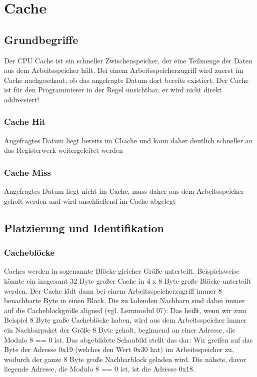 \section{Cache}
	\subsection{Grundbegriffe}
		Der CPU Cache ist ein schneller Zwischenspeicher, der eine Teilmenge der Daten aus dem Arbeitsspeicher hält. Bei einem Arbeitsspeicherzugriff wird zuerst im Cache nachgeschaut, ob das angefragte Datum dort bereits existiert. Der Cache ist für den Programmierer in der Regel unsichtbar, er wird nicht direkt addressiert!
		\subsubsection{Cache Hit}
			Angefragtes Datum liegt bereits im Chache und kann daher deutlich schneller an das Registerwerk weitergeleitet werden
		\subsubsection{Cache Miss}
			Angefragtes Datum liegt nicht im Cache, muss daher aus dem Arbeitsspeicher geholt werden und wird anschließend im Cache abgelegt
	\subsection{Platzierung und Identifikation}
		\subsubsection{Cacheblöcke}
			Caches werden in sogenannte Blöcke gleicher Größe unterteilt. Beispielsweise könnte ein insgesamt 32 Byte großer Cache in 4 x 8 Byte große Blöcke unterteilt werden. Der Cache lädt dann bei einem Arbeitsspeicherzugriff immer 8 benachbarte Byte in einen Block.
			\newline \newline
			Die zu ladenden Nachbarn sind dabei immer auf die Cacheblockgröße \glqq aligned \grqq (vgl. Lernmodul 07): Das heißt, wenn wir zum Beispiel 8 Byte große Cacheblöcke haben, wird aus dem Arbeitsspeicher immer ein Nachbarpaket der Größe 8 Byte geholt, beginnend an einer Adresse, die Modulo 8 == 0 ist. 
			\newline \newline
			Das abgebildete Schaubild stellt das dar: Wir greifen auf das Byte der Adresse 0x19 (welches den Wert 0x30 hat) im Arbeitsspeicher zu, wodurch der ganze 8 Byte große Nachbarblock geladen wird. Die nähste, davor liegende Adresse, die Modulo 8 == 0 ist, ist die Adresse 0x18.

